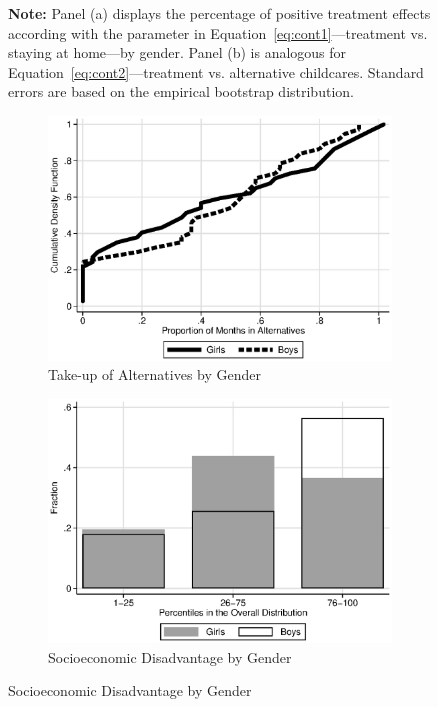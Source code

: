 \begin{figure}
\begin{subfigure}[h]{0.49\textwidth}
\end{subfigure}
\footnotesize \justify
\textbf{Note:} Panel (a) displays the percentage of positive treatment effects according with the parameter in Equation~\eqref{eq:cont1}---treatment vs. staying at home---by gender. Panel (b) is analogous for Equation~\eqref{eq:cont2}---treatment vs. alternative childcares. Standard errors are based on the empirical bootstrap distribution. \\
\end{figure}

\begin{figure}
\centering
\caption{Gender and Baseline Socioeconomic Disadvantage in the Control Group} \label{figure:socdis}
\begin{subfigure}[h]{0.4\textwidth}
	\centering
	\caption{Take-up of Alternatives by Gender} \label{figure:altgender}
	\includegraphics[width=\textwidth]{output/abccare_controlcontamination_boysgirls}
\end{subfigure}%
\begin{subfigure}[h]{0.4\textwidth}
	\centering
	\caption{Socioeconomic Disadvantage by Gender} \label{figure:disadgender}
	\includegraphics[width=\textwidth]{output/factorbase_girlsboyscompare}

\end{subfigure}
\end{figure}
